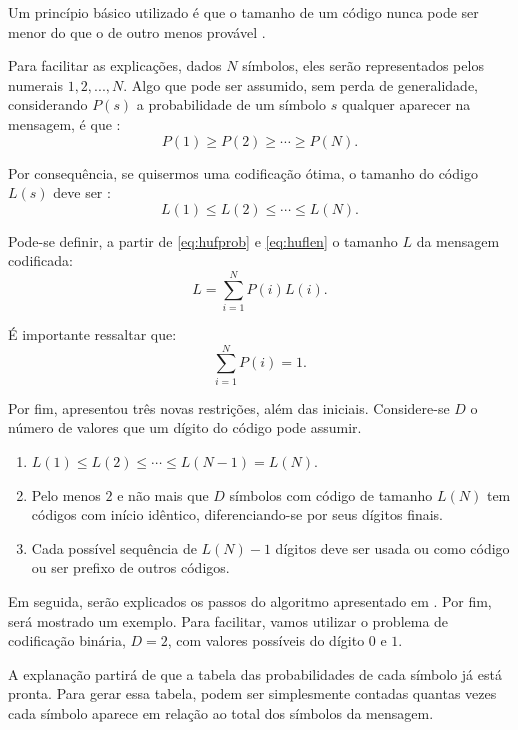 \documentclass[cic,tc]{iiufrgs}
\begin{document}
Um princípio básico utilizado é que o tamanho de um código nunca pode ser menor 
do que o de outro menos provável \cite{HuffmanCoding}.

Para facilitar as explicações, dados $N$ símbolos, eles serão representados 
pelos numerais $1, 2, ..., N$.
Algo que pode ser assumido, sem perda de generalidade, considerando $P(s)$ a probabilidade de um símbolo
$s$ qualquer aparecer na mensagem, é que \cite{HuffmanCoding}:
\begin{equation}
    \label{eq:hufprob}
    P(1) \ge P(2) \ge \cdots \ge P(N).
\end{equation}

Por consequência, se quisermos uma codificação ótima, o tamanho do código $L(s)$ 
deve ser \cite{HuffmanCoding}:
\begin{equation}
    \label{eq:huflen}
    L(1) \le L(2) \le \cdots \le L(N).
\end{equation}

Pode-se definir, a partir de \eqref{eq:hufprob} e \eqref{eq:huflen} o tamanho $L$ da mensagem 
codificada:
\begin{equation*}
    L = \sum_{i=1}^N {P(i)L(i)}.
\end{equation*}

É importante ressaltar que:
\begin{equation*}
    \sum_{i=1}^N {P(i)} = 1.
\end{equation*}

Por fim, \citet{HuffmanCoding} apresentou três novas restrições, além das iniciais.
Considere-se $D$ o número de valores que um dígito do código pode assumir.
\begin{enumerate}
    \item $L(1) \le L(2) \le \cdots \le L(N-1) = L(N)$.
    \item Pelo menos $2$ e não mais que $D$ símbolos com código de tamanho $L(N)$ tem códigos 
    com início idêntico, diferenciando-se por seus dígitos finais.
    \item Cada possível sequência de $L(N)-1$ dígitos deve ser usada ou como código ou ser 
    prefixo de outros códigos.
\end{enumerate}

Em seguida, serão explicados os passos do algoritmo apresentado em \citet{HuffmanCoding}.
Por fim, será mostrado um exemplo.
Para facilitar, vamos utilizar o problema de codificação binária, $D=2$, com valores 
possíveis do dígito $0$ e $1$.

A explanação partirá de que a tabela das probabilidades de cada símbolo já está pronta.
Para gerar essa tabela, podem ser simplesmente contadas quantas vezes cada símbolo aparece
em relação ao total dos símbolos da mensagem.
\end{document}
